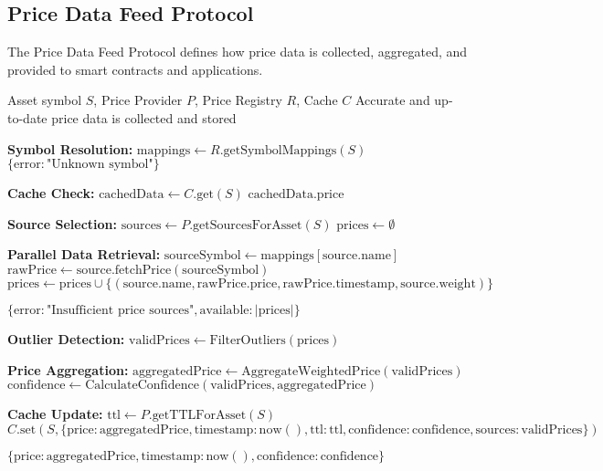 \subsection{Price Data Feed Protocol}
\label{subsec:price-feed-protocol}

The Price Data Feed Protocol defines how price data is collected, aggregated, and provided to smart contracts and applications.

\begin{protocol}
\label{prot:price-data-collection}
\begin{algorithmic}[1]
\Require Asset symbol $S$, Price Provider $P$, Price Registry $R$, Cache $C$
\Ensure Accurate and up-to-date price data is collected and stored

\State \textbf{Symbol Resolution:}
\State $\text{mappings} \gets R.\text{getSymbolMappings}(S)$
    \State \Return $\{\text{error}: \text{"Unknown symbol"}\}$
\EndIf

\State \textbf{Cache Check:}
\State $\text{cachedData} \gets C.\text{get}(S)$
    \State \Return $\text{cachedData}.\text{price}$
\EndIf

\State \textbf{Source Selection:}
\State $\text{sources} \gets P.\text{getSourcesForAsset}(S)$
\State $\text{prices} \gets \emptyset$

\State \textbf{Parallel Data Retrieval:}
    \State $\text{sourceSymbol} \gets \text{mappings}[\text{source}.\text{name}]$
    \State $\text{rawPrice} \gets \text{source}.\text{fetchPrice}(\text{sourceSymbol})$
        \State $\text{prices} \gets \text{prices} \cup \{(\text{source}.\text{name}, \text{rawPrice}.\text{price}, \text{rawPrice}.\text{timestamp}, \text{source}.\text{weight})\}$
    \EndIf
\EndFor

    \State \Return $\{\text{error}: \text{"Insufficient price sources"}, \text{available}: |\text{prices}|\}$
\EndIf

\State \textbf{Outlier Detection:}
\State $\text{validPrices} \gets \text{FilterOutliers}(\text{prices})$

\State \textbf{Price Aggregation:}
\State $\text{aggregatedPrice} \gets \text{AggregateWeightedPrice}(\text{validPrices})$
\State $\text{confidence} \gets \text{CalculateConfidence}(\text{validPrices}, \text{aggregatedPrice})$

\State \textbf{Cache Update:}
\State $\text{ttl} \gets P.\text{getTTLForAsset}(S)$
\State $C.\text{set}(S, \{\text{price}: \text{aggregatedPrice}, \text{timestamp}: \text{now}(), \text{ttl}: \text{ttl}, \text{confidence}: \text{confidence}, \text{sources}: \text{validPrices}\})$

\State \Return $\{\text{price}: \text{aggregatedPrice}, \text{timestamp}: \text{now}(), \text{confidence}: \text{confidence}\}$
\end{algorithmic}
\end{protocol}

